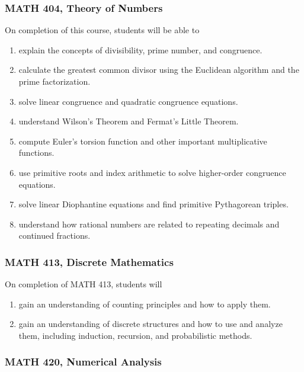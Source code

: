 \documentclass[10pt]{article}
\newenvironment{alphalist}{
\begin{enumerate}[label=(\arabic*),widest=107 ,leftmargin=25pt, itemsep=0pt]}
{\end{enumerate}}
\begin{document}
\subsubsection*{MATH 404, Theory of Numbers}

On completion of this course, students will be able to
\begin{alphalist}
    \item explain the concepts of divisibility, prime number, and congruence. 
    \item calculate the greatest common divisor using the Euclidean algorithm and the prime factorization.
    \item solve linear congruence and quadratic congruence equations.
    \item understand Wilson's Theorem and Fermat's Little Theorem. 
    \item compute Euler's torsion function and other important multiplicative functions.
    \item use primitive roots and index arithmetic to solve higher-order congruence equations.  
    \item solve linear Diophantine equations and find primitive Pythagorean triples.
    \item understand how rational numbers are related to repeating decimals and continued fractions.
\end{alphalist}

\subsubsection*{MATH 413, Discrete Mathematics}

On completion of MATH 413, students will 
\begin{alphalist}
    \item gain an understanding of counting principles and how to apply them.
    \item gain an understanding of discrete structures and how to use and analyze them, including induction, recursion, and probabilistic methods.
\end{alphalist}

\subsubsection*{MATH 420, Numerical Analysis}
\end{document}
